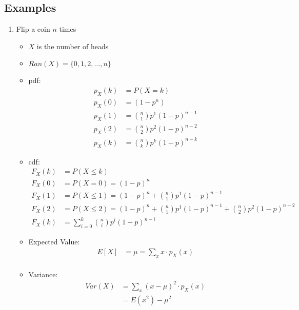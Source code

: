 \documentclass[12pt]{article}
\begin{document}
        \subsection{Examples}
            \begin{enumerate}
                \item Flip a coin $n$ times
                \begin{itemize}
                    \item $X$ is the number of heads
                    \item $Ran(X) = \{0, 1, 2, \ldots, n\}$
                    \item pdf:
                    \begin{align*}
                        p_X(k) &= P(X = k) \\
                        p_X(0) &= (1-p^n) \\
                        p_X(1) &= \binom{n}{1} p^1 {(1-p)}^{n-1} \\
                        p_X(2) &= \binom{n}{2} p^2 {(1-p)}^{n-2} \\
                        p_X(k) &= \binom{n}{k} p^k {(1-p)}^{n-k}
                    \end{align*}
                    \item cdf:
                    \begin{align*}
                        F_X(k) &= P(X \leq k) \\
                        F_X(0) &= P(X = 0) = {(1-p)}^n \\
                        F_X(1) &= P(X \leq 1) = {(1-p)}^n + \binom{n}{1} p^1 {(1-p)}^{n-1} \\
                        F_X(2) &= P(X \leq 2) = {(1-p)}^n + \binom{n}{1} p^1 {(1-p)}^{n-1} + \binom{n}{2} p^2 {(1-p)}^{n-2} \\
                        F_X(k) &= \sum_{i=0}^{k} \binom{n}{i} p^i {(1-p)}^{n-i}
                    \end{align*}
                    \item Expected Value:
                    \begin{align*}
                        E[X] &= \mu = \sum_{x} x \cdot p_X(x) \\
                    \end{align*} 
                    \item Variance:
                    \begin{align*}
                        Var(X) &= \sum_{x} {(x - \mu)}^2 \cdot p_X(x) \\
                        &= E(x^2) - \mu^2 \\
                    \end{align*}
                \end{itemize}
            \end{enumerate}
\end{document}
